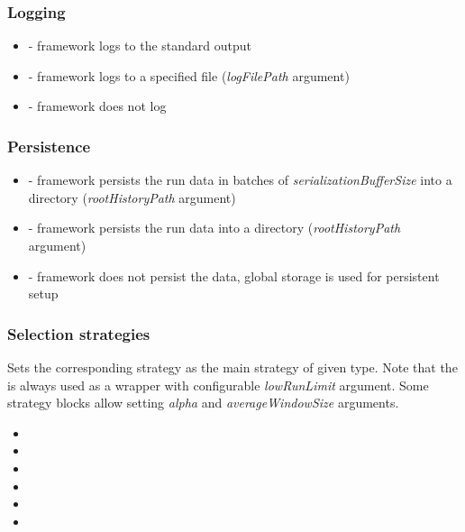 \documentclass[12pt,a4paper]{report}
\begin{document}
\subsubsection{Logging}
\begin{itemize}
	\item {} - framework logs to the standard output
	\item {} - framework logs to a specified file (\textit{logFilePath} argument)
	\item {} - framework does not log
\end{itemize}

\subsubsection{Persistence}
\begin{itemize}
	\item {} - framework persists the run data in batches of \textit{serializationBufferSize} into a directory (\textit{rootHistoryPath} argument)
	\item {} - framework persists the run data into a directory (\textit{rootHistoryPath} argument)
	\item {} - framework does not persist the data, global storage is used for persistent setup
\end{itemize}

\subsubsection{Selection strategies}
Sets the corresponding strategy as the main strategy of given type. Note that the  is always used as a wrapper with configurable \textit{lowRunLimit} argument. Some strategy blocks allow setting \textit{alpha} and \textit{averageWindowSize} arguments.
\begin{itemize}
	\item {}
	\item {}
	\item {}	
	\item {}
	\item {}
	\item {}
\end{itemize}
\end{document}
